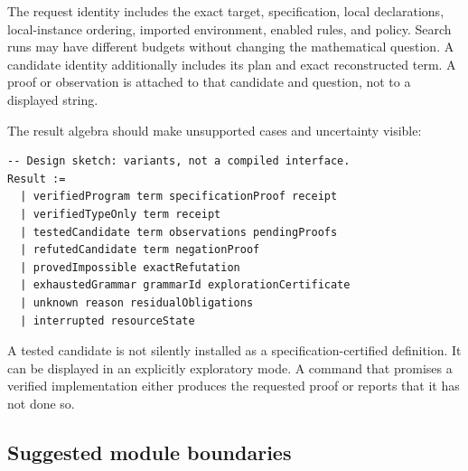 \documentclass[11pt,letterpaper]{article}
\theoremstyle{definition}
\theoremstyle{remark}
\begin{document}
The request identity includes the exact target, specification, local declarations, local-instance ordering, imported environment, enabled rules, and policy. Search runs may have different budgets without changing the mathematical question. A candidate identity additionally includes its plan and exact reconstructed term. A proof or observation is attached to that candidate and question, not to a displayed string.

The result algebra should make unsupported cases and uncertainty visible:
\Needspace{173pt}
\begin{lstlisting}
-- Design sketch: variants, not a compiled interface.
Result :=
  | verifiedProgram term specificationProof receipt
  | verifiedTypeOnly term receipt
  | testedCandidate term observations pendingProofs
  | refutedCandidate term negationProof
  | provedImpossible exactRefutation
  | exhaustedGrammar grammarId explorationCertificate
  | unknown reason residualObligations
  | interrupted resourceState
\end{lstlisting}
A tested candidate is not silently installed as a specification-certified definition. It can be displayed in an explicitly exploratory mode. A command that promises a verified implementation either produces the requested proof or reports that it has not done so.

\subsection{Suggested module boundaries}
\end{document}

